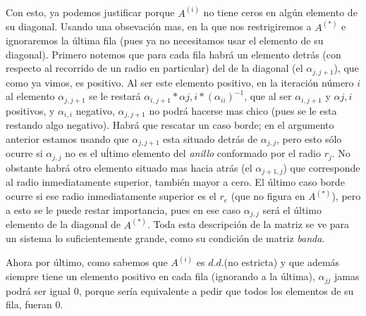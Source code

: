 \\
\\
Con esto, ya podemos justificar porque $A^{(i)}$ no tiene ceros en algún elemento de su diagonal. Usando una obsevaci\'on mas, en la que nos restrigiremos a $A^{(*)}$ e ignoraremos la \'ultima fila (pues ya no necesitamos usar el elemento de su diagonal).
Primero notemos que para cada fila habr\'a un elemento detrás (con respecto al recorrido de un radio en particular) del de la diagonal (el $\alpha_{j,j+1}$), que como ya vimos, es positivo. Al ser este elemento positivo, en la iteraci\'on n\'umero $i$ al elemento $\alpha_{j,j+1}$ se le restar\'a $\alpha_{i,j+1}*\alpha{j,i}*(\alpha_{ii})^{-1}$, que al ser $\alpha_{i,j+1}$ y $\alpha{j,i}$ positivos, y $\alpha_{i,i}$ negativo, $\alpha_{j,j+1}$ no podr\'a hacerse mas chico (pues se le esta restando algo negativo). Habrá que rescatar un caso borde; en el argumento anterior estamos usando que $\alpha_{j,j+1}$ esta situado detrás de $\alpha_{j,j}$, pero esto s\'olo ocurre si $\alpha_{j,j}$ no es el u\'ltimo elemento del \textit{anillo} conformado por el radio $r_{j}$. No obstante habrá otro elemento situado mas hacia atrás (el $\alpha_{j+1,j}$) que corresponde al radio inmediatamente superior, tambi\'en mayor a cero. El \'ultimo caso borde ocurre si ese radio inmediatamente superior es el $r_e$ (que no figura en $A^{(*)}$), pero a esto se le puede restar importancia, pues en ese caso $\alpha_{j,j}$ ser\'a el \'ultimo elemento de la diagonal de $A^{(*)}$. Toda esta descripci\'on de la matriz se ve para un sistema lo suficientemente grande, como su condici\'on de matriz \textit{banda}. 

Ahora por \'ultimo, como sabemos que $A^{(i)}$ es $d.d.$(no estricta) y que adem\'as siempre tiene un elemento positivo en cada fila (ignorando a la \'ultima), $\alpha_{jj}$ jamas podr\'a ser igual $0$, porque ser\'ia equivalente a pedir que todos los elementos de su fila, fueran $0$.

 
